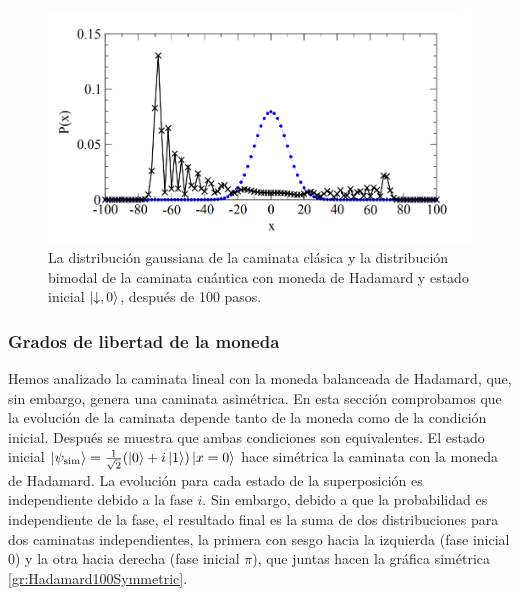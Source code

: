 \begin{figure}[ht]
\centering
\includegraphics[width=1\textwidth]{Kap3/comparisonQW.png}
\caption{La distribución gaussiana de la caminata clásica y la distribución bimodal de la caminata cuántica con moneda de Hadamard y estado inicial $\ket{\downarrow,0}$, después de 100 pasos.}
\label{gr:LineaHadamard100}
\end{figure}

\subsubsection{Grados de libertad de la moneda}\label{sec:Moneda}
Hemos analizado la caminata lineal con la moneda balanceada de Hadamard, que, sin embargo, genera una caminata asimétrica. En esta sección comprobamos que la evolución de la caminata depende tanto de la moneda como de la condición inicial. Después se muestra que ambas condiciones son equivalentes.
El estado inicial $\ket{\psi_{\text{sim}}}=\frac{1}{\sqrt{2}}(\ket{0}+i\ket{1})\ket{x=0}$ hace simétrica la caminata con la moneda de Hadamard. La evolución para cada estado de la superposición es independiente debido a la fase $i$. Sin embargo, debido a que la probabilidad es independiente de la fase, el resultado final es la suma de dos distribuciones para dos caminatas independientes, la primera con sesgo hacia la izquierda (fase inicial $0$) y la otra hacia derecha (fase inicial $\pi$), que juntas hacen la gráfica simétrica \ref{gr:Hadamard100Symmetric}. \\

